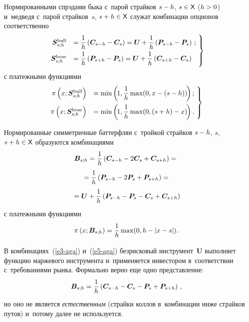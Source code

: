 \begin{multicols}{2}
  Нормированными спрэдами быка с~парой страйков $s\hm-h$, $s \hm\in 
{\mathsf X}$ ($h \hm>0$)  и~медведя с~парой страйков~$s$, $s\hm+h \hm\in 
{\mathsf X}$ служат комбинации опционов соответственно 
  \begin{equation}
  \left.
  \begin{array}{rl}
 \!\!\!\! \bm{S}_{s;h}^{\mathrm{bull}} &= \fr{1}{h}\left( \bm{C}_{s-h}-\bm{C}_s\right) =
\bm{U}+\fr{1}{h}\left( \bm{P}_{s-h}-\bm{P}_s\right)\,;\\[6pt]
 \!\! \!\! \bm{S}_{s;h}^{\mathrm{bear}} &=\fr{1}{h}\left( \bm{P}_{s+h}-\bm{P}_s\right) 
=\bm{U}+\fr{1}{h} \left( \bm{C}_{s+h}-\bm{C}_s\right)
  \end{array}\!
  \right\}\!\!
  \label{e3-aga}
  \end{equation}
с платежными функциями 
\begin{equation}
\left.
\begin{array}{rl}
 \!\!\!\!\pi\left( x;\bm{S}_{s;h}^{\mathrm{bull}}\right) &= \min \left(\! 1,\fr{1}{h}\max (0,x-(s-h))\!\right);\\[9pt]
\! \!\!\!\pi\left( x;\bm{S}_{s;h}^{\mathrm{bear}}\right) &= \min \left(\! 1,\fr{1}{h}\max (0, (s+h)-x)\!\right).
\end{array}\!
\right\}\!
\label{e4-aga}
\end{equation}
  
  Нормированные симметричные баттерфляи с~тройкой страйков $s\hm-h$, $s$, 
$s\hm+h \hm\in {\mathsf X}$ образуются комбинациями 
  \begin{multline}
  \bm{B}_{s;h} = \displaystyle\frac{\displaystyle 1\mathstrut}{\displaystyle h\mathstrut}\left( \bm{C}_{s-h} -2\bm{C}_s +\bm{C}_{s+h}\right) 
={}\\
  {}= \displaystyle\frac{\displaystyle 1\mathstrut}{\displaystyle h\mathstrut} \left( \bm{P}_{s-h} -2\bm{P}_s+\bm{P}_{s+h}\right) 
={}\\
{}=\bm{U}+\displaystyle\frac{\displaystyle 1\mathstrut}{\displaystyle h\mathstrut}\left( \bm{P}_{s-h} -\bm{P}_s -
\bm{C}_s+\bm{C}_{s+h}\right)
  \label{e5-aga}
  \end{multline}
с платежными функциями 
\begin{equation}
\pi \left( x;\bm{B}_{s;h}\right) =\displaystyle\frac{\displaystyle 1\mathstrut}{\displaystyle h\mathstrut}\max ( 0, h-\vert x-s\vert).
\label{e6-aga}
\end{equation}
  
  В комбинациях~(\ref{e3-aga}) и~(\ref{e5-aga}) безрисковый 
инструмент~$\bm{U}$ выполняет функцию маржевого инструмента 
и~применяется инвестором в~соответствии с~требованиями рынка. Формально 
верно еще одно пред\-став\-ле\-ние:
  \begin{equation*}
  \bm{B}_{s;h}=\displaystyle\frac{\displaystyle 1\mathstrut}{\displaystyle h\mathstrut}\left( \bm{C}_{s-h} -\bm{C}_s -\bm{P}_s 
+\bm{P}_{s+h}\right)\,,
  \end{equation*}
но оно не является \textit{естественным} (страйки коллов в~комбинации ниже 
страйков путов) и~потому далее не используется. 
  

\end{multicols}
